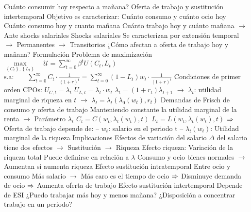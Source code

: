 \documentclass{nuevotema}
\begin{document}
\begin{esquemal}
				\4[$\then$] Cuánto consumir hoy respecto a mañana?
			\3 Oferta de trabajo y sustitución intertemporal
				\4 Objetivo es caracterizar:
				\4[] Cuánto consumo y cuánto ocio hoy
				\4[] Cuánto consumo hoy y cuanto mañana
				\4[] Cuánto trabajo hoy y cuánto mañana
				\4[] $\to$ Ante shocks salariales
				\4 Shocks salariales
				\4[] Se caracterizan por extensión temporal
				\4[] $\to$ Permanentes
				\4[] $\to$ Transitorios
				\4[] ¿Cómo afectan a oferta de trabajo hoy y mañana?
		\2 Formulación
			\3 Problema de maximización
				\4[] $\underset{\left\lbrace C_t \right\rbrace, \left\lbrace L_t \right\rbrace}{\max} \quad \mathcal{U} = \sum_{t=0}^{\infty} \beta^t U(C_t, L_t)$
				\4[] $\text{s.a:} \quad \quad \sum_{t=0}^\infty C_t \cdot \frac{1}{(1+r)^t}= \sum_{t=0}^\infty (1-L_t)w_t \cdot \frac{1}{(1+r)^t}$
			\3 Condiciones de primer orden
				\4 CPOs:
				\4[] $U_{C,t} = \lambda_t$
				\4[] $U_{L,t} = \lambda_t \cdot w_t$
				\4[] $\lambda_t = (1+r_t) \lambda_{t+1}$
				\4[] $\to$ $\lambda_t$: utilidad marginal de riqueza en $t$
				\4[] $\to$ $\lambda_t = \lambda_t(\lambda_0(w_t), r_t)$
				\4 Demandas de Frisch de consumo y oferta de trabajo
				\4[] Manteniendo constante la utilidad marginal de la renta
				\4[] $\to$ Parámetro $\lambda_t$
				\4[] $C_t = C(w_t,\lambda_t(w_t),t)$
				\4[] $L_t = L(w_t,\lambda_t(w_t),t)$
				\4[] $\then$ Oferta de trabajo depende de:
				\4[] -- $w_t$: salario en el periodo t
				\4[] -- $\lambda_t (w_t)$: Utilidad marginal de la riqueza
		\2 Implicaciones
			\3 Efectos de variación del salario
				\4 $\Delta$ del salario tiene dos efectos
				\4[] $\to$ Sustitución
				\4[] $\to$ Riqueza
				\4 Efecto riqueza:
				\4[] Variación de la riqueza total
				\4[] Puede definirse en relación a $\lambda$
				\4[] Consumo y ocio bienes normales
				\4[] $\to$ Aumentan si aumenta riqueza
				\4 Efecto sustitución intratemporal
				\4[] Entre ocio y consumo
				\4[] Más salario
				\4[] $\to$ Más caro es el tiempo de ocio
				\4[] $\then$ Disminuye demanda de ocio
				\4[] $\then$ Aumenta oferta de trabajo
				\4 Efecto sustitución intertemporal
				\4[] Depende de ESI
				\4[] ¿Puedo trabajar más hoy y menos mañana?
				\4[] ¿Disposición a concentrar trabajo en un periodo?

\end{esquemal}
\end{document}
